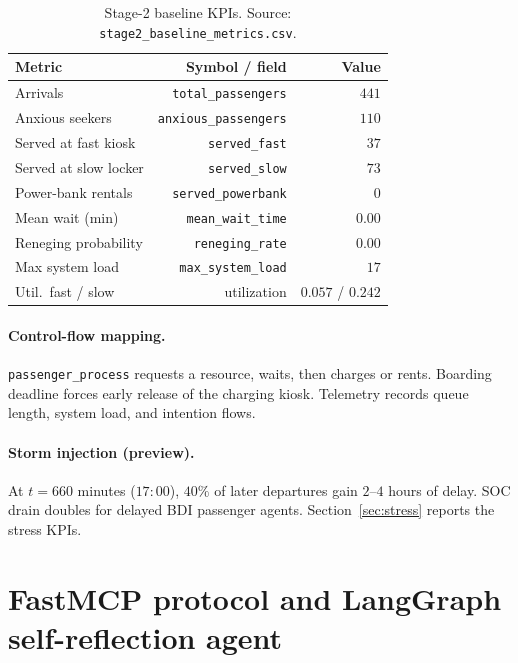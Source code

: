 \documentclass[11pt]{article}
\begin{document}
\begin{table}[htbp]
\centering
\caption{Stage-2 baseline KPIs. Source: \texttt{stage2\_baseline\_metrics.csv}.}
\label{tab:stage2}
\begin{tabular}{lrr}
\toprule
Metric & Symbol / field & Value \\
\midrule
Arrivals & \texttt{total\_passengers} & $441$ \\
Anxious seekers & \texttt{anxious\_passengers} & $110$ \\
Served at fast kiosk & \texttt{served\_fast} & $37$ \\
Served at slow locker & \texttt{served\_slow} & $73$ \\
Power-bank rentals & \texttt{served\_powerbank} & $0$ \\
Mean wait (min) & \texttt{mean\_wait\_time} & $0.00$ \\
Reneging probability & \texttt{reneging\_rate} & $0.00$ \\
Max system load & \texttt{max\_system\_load} & $17$ \\
Util.\ fast / slow & utilization & $0.057$ / $0.242$ \\
\bottomrule
\end{tabular}
\end{table}

\paragraph{Control-flow mapping.}
\texttt{passenger\_process} requests a resource, waits, then charges or rents.
Boarding deadline forces early release of the charging kiosk.
Telemetry records queue length, system load, and intention flows.

\paragraph{Storm injection (preview).}
At $t=660$ minutes ($17{:}00$), $40\%$ of later departures gain
$2$--$4$ hours of delay.
SOC drain doubles for delayed BDI passenger agents.
Section~\ref{sec:stress} reports the stress KPIs.


\section{FastMCP protocol and LangGraph self-reflection agent}
\end{document}
